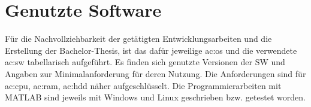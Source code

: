 %
\chapter{Genutzte Software}\label{ch:genutzte-sw}

Für die Nachvollziehbarkeit der getätigten Entwicklungsarbeiten und die Erstellung der Bachelor-Thesis, ist das dafür jeweilige \gls{ac:os}
und die verwendete \gls{ac:sw} tabellarisch aufgeführt. Es finden sich genutzte Versionen der SW und Angaben zur Minimalanforderung für deren
Nutzung. Die Anforderungen sind für \gls{ac:cpu}, \gls{ac:ram}, \gls{ac:hdd} näher aufgeschlüsselt. Die Programmierarbeiten mit MATLAB sind
jeweils mit Windows und Linux geschrieben bzw. getestet worden.

\vspace{5mm}
